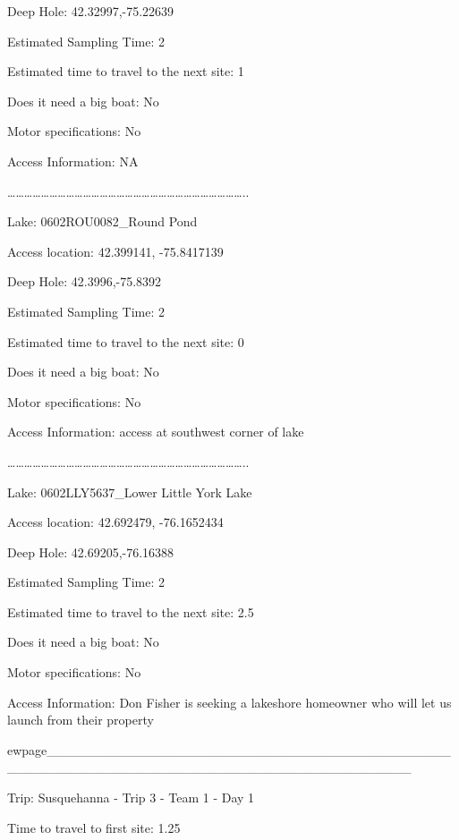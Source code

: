 \documentclass[]{article}
\begin{document}
Deep Hole: 42.32997,-75.22639

Estimated Sampling Time: 2

Estimated time to travel to the next site: 1

Does it need a big boat: No

Motor specifications: No

Access Information: NA

\ldots{}\ldots{}\ldots{}\ldots{}\ldots{}\ldots{}\ldots{}\ldots{}\ldots{}\ldots{}\ldots{}\ldots{}\ldots{}\ldots{}\ldots{}\ldots{}\ldots{}\ldots{}\ldots{}\ldots{}\ldots{}\ldots{}\ldots{}\ldots{}\ldots{}\ldots{}\ldots{}\ldots{}..

Lake: 0602ROU0082\_Round Pond

Access location: 42.399141, -75.8417139

Deep Hole: 42.3996,-75.8392

Estimated Sampling Time: 2

Estimated time to travel to the next site: 0

Does it need a big boat: No

Motor specifications: No

Access Information: access at southwest corner of lake

\ldots{}\ldots{}\ldots{}\ldots{}\ldots{}\ldots{}\ldots{}\ldots{}\ldots{}\ldots{}\ldots{}\ldots{}\ldots{}\ldots{}\ldots{}\ldots{}\ldots{}\ldots{}\ldots{}\ldots{}\ldots{}\ldots{}\ldots{}\ldots{}\ldots{}\ldots{}\ldots{}\ldots{}..

Lake: 0602LLY5637\_Lower Little York Lake

Access location: 42.692479, -76.1652434

Deep Hole: 42.69205,-76.16388

Estimated Sampling Time: 2

Estimated time to travel to the next site: 2.5

Does it need a big boat: No

Motor specifications: No

Access Information: Don Fisher is seeking a lakeshore homeowner who will
let us launch from their property

ewpage\_\_\_\_\_\_\_\_\_\_\_\_\_\_\_\_\_\_\_\_\_\_\_\_\_\_\_\_\_\_\_\_\_\_\_\_\_\_\_\_\_\_\_\_\_\_\_\_\_\_\_\_\_\_\_\_\_\_\_\_\_\_\_\_\_\_\_\_\_\_\_\_\_\_\_\_\_\_\_\_\_\_\_\_\_\_

Trip: Susquehanna - Trip 3 - Team 1 - Day 1

Time to travel to first site: 1.25
\end{document}
